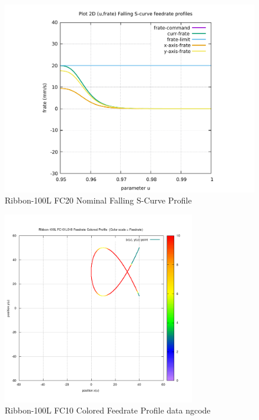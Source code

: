 \begin{figure}
	\caption     {Ribbon-100L FC20 Nominal Falling S-Curve Profile}
	\label{16-img-Ribbon-100L-FC20-Nominal-Falling-S-Curve-Profile.pdf}
\includegraphics[width=1.00\textwidth]{Chap4/appendix/app-Ribbon-100L/plots/16-img-Ribbon-100L-FC20-Nominal-Falling-S-Curve-Profile.pdf}
\end{figure}

\clearpage
\pagebreak

\begin{figure}
	\caption     {Ribbon-100L FC10 Colored Feedrate Profile data ngcode}
	\label{17-img-Ribbon-100L-FC10-Colored-Feedrate-Profile-data_ngcode.png}
\includegraphics[width=0.75\textwidth]{Chap4/appendix/app-Ribbon-100L/plots/17-img-Ribbon-100L-FC10-Colored-Feedrate-Profile-data_ngcode.png}
\end{figure}



